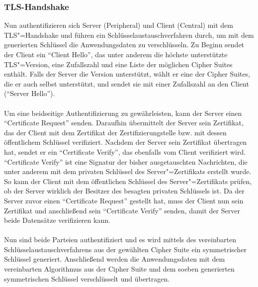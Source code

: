 \subsubsection{TLS-Handshake}
Nun authentifizieren sich Server (Peripheral) und Client (Central) mit dem TLS"=Handshake und führen ein Schlüsselaustauschverfahren durch, um mit dem generierten Schlüssel die Anwendungsdaten zu verschlüsseln. Zu Beginn sendet der Client ein "`Client Hello"', das unter anderem die höchste unterstützte TLS"=Version, eine Zufallszahl und eine Liste der möglichen Cipher Suites enthält. Falls der Server die Version unterstützt, wählt er eine der Cipher Suites, die er auch selbst unterstützt, und sendet sie mit einer Zufallszahl an den Client ("`Server Hello"').
\\\\
Um eine beidseitige Authentifizierung zu gewährleisten, kann der Server einen "`Certificate Request"' senden. Daraufhin übermittelt der Server sein Zertifikat, das der Client mit dem Zertifikat der Zertifizierungstelle bzw. mit dessen öffentlichem Schlüssel verifiziert. Nachdem der Server sein Zertifikat übertragen hat, sendet er ein "`Certificate Verify"', das ebenfalls vom Client verifiziert wird. "`Certificate Verify"' ist eine Signatur der bisher ausgetauschten Nachrichten, die unter anderem mit dem privaten Schlüssel des Server"=Zertifikats erstellt wurde. So kann der Client mit dem öffentlichen Schlüssel des Server"=Zertifikats prüfen, ob der Server wirklich der Besitzer des besagten privaten Schlüssels ist. Da der Server zuvor einen "`Certificate Request"' gestellt hat, muss der Client nun sein Zertifikat und anschließend sein "`Certificate Verify"' senden, damit der Server beide Datensätze verifizieren kann.
\\\\
Nun sind beide Parteien authentifiziert und es wird mittels des vereinbarten Schlüsselaustauschverfahrens aus der gewählten Cipher Suite ein symmetrischer Schlüssel generiert. Anschließend werden die Anwendungsdaten mit dem vereinbarten Algorithmus aus der Cipher Suite und dem soeben generierten symmetrischen Schlüssel verschlüsselt und übertragen.